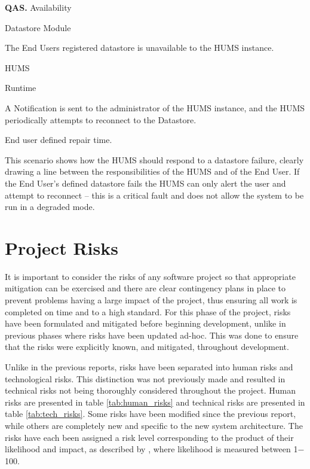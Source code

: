 \documentclass[10pt,a4paper]{article}
\newcommand{\qas}[1]{\textcolor{reqColor}{\textbf{QAS.#1}}}
\newenvironment{scenario}[1]{
\newcommand{\source}[1]{\item[Source of Stimulus:] ##1}
\newcommand{\stimulus}[1]{\item[Stimulus:] ##1}
\newcommand{\artifact}[1]{\item[Artifact:] ##1}
\newcommand{\environment}[1]{\item[Environment:] ##1}
\newcommand{\response}[1]{\item[Response:] ##1}
\newcommand{\measure}[1]{\item[Response Measure:] ##1}
\newcommand{\rationale}[1]{\item[Scenario Rationale:] ##1}
\newcommand{\quality}[1]{\item[Quality:] ##1}
		\begin{description} [noitemsep]	
		\item[Scenario ID:] \qas{#1}
		}{\end{description} \vspace*{0.3cm}
		}
\begin{document}
\begin{scenario}{4}
\quality{Availability}
\source{Datastore Module}
\stimulus{The End Users registered datastore is unavailable to the HUMS instance.}
\artifact{HUMS}
\environment{Runtime}
\response{A Notification is sent to the administrator of the HUMS instance, and the HUMS periodically attempts to reconnect to the Datastore.}
\measure{End user defined repair time.}
\rationale{This scenario shows how the HUMS should respond to a datastore failure, clearly drawing a line between the responsibilities of the HUMS and of the End User. If the End User's defined datastore fails the HUMS can only alert the user and attempt to reconnect -- this is a critical fault and does not allow the system to be run in a degraded mode.}
\end{scenario}

\section{Project Risks}
\label{sec:risks}
It is important to consider the risks of any software project so that appropriate mitigation can be exercised and there are clear contingency plans in place to prevent problems having a large impact of the project, thus ensuring all work is completed on time and to a high standard. For this phase of the project, risks have been formulated and mitigated before beginning development, unlike in previous phases where risks have been updated ad-hoc. This was done to ensure that the risks were explicitly known, and mitigated, throughout development. 

Unlike in the previous reports, risks have been separated into human risks and technological risks. This distinction was not previously made and resulted in technical risks not being thoroughly considered throughout the project. Human risks are presented in table \ref{tab:human_risks} and technical risks are presented in table \ref{tab:tech_risks}.
Some risks have been modified since the previous report, while others are completely new and specific to the new system architecture. The risks have each been assigned a risk level corresponding to the product of their likelihood and impact, as described by \cite{risks}, where likelihood is measured between 1$-$100.
\end{document}
